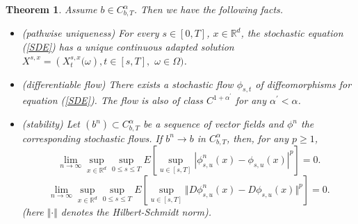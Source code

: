\documentclass[a4paper,10pt]{article}
\newtheorem{theorem}{Theorem}
\begin{document}
\begin{theorem}
\label{th:flow1} Assume $b\in C_{b,T}^{{\alpha}}$.
 Then we have the following facts.

\begin{itemize}
\item [(i)](pathwise uniqueness) For every $s\in\left[  0,T\right]
$, $x\in{\mathbb{R}}^{d}$, the stochastic equation (\ref{SDE}) has
a unique continuous adapted solution $X^{s,x}=\left(
X_{t}^{s,x}\big( \omega\right) ,t\in\left[ s,T\right],$
$\omega\in\Omega\big)  $.

\item[(ii)] (differentiable flow) There exists a stochastic flow $\phi_{s,t}$
of diffeomorphisms for equation (\ref{SDE}). The flow is also of class
$C^{1+{\alpha}^{\prime}}$ for any ${\alpha}^{\prime}<{\alpha}$.

\item[(iii)] (stability) Let $(b^{n})\subset C_{b,T}^{{\alpha}}$
be a sequence of vector fields and $\phi^{n}$ the corresponding
stochastic flows. If $b^{n}\rightarrow b$ in $C_{b,T}^{\alpha}$,
then, for any $p\geq 1$,
\begin{equation}
\label{stability1}
\lim_{n\rightarrow\infty}\sup_{x\in{\mathbb{R}}^{d}} \sup_{0\leq s\leq
T} E[ \sup_{u \in [s,T]} |\phi_{s,u}^{n}(x)-\phi_{s,u}(x)|^{p}]=0.
\end{equation}%
\begin{equation}
\label{stability2}
\lim_{n\rightarrow\infty}\sup_{x\in{\mathbb{R}}^{d}}\sup_{0\leq s\leq
T} E[  \sup_{u \in [s,T]} \Vert D\phi_{s,u}^{n}(x)-D\phi_{s,u}(x)\Vert^{p}]=0.
\end{equation}
(here $\Vert\cdot\Vert$ denotes the Hilbert-Schmidt norm).
\end{itemize}
\end{theorem}
\end{document}

